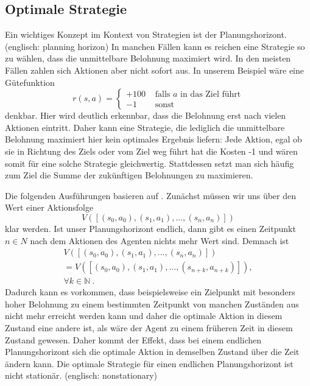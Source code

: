 \documentclass[a4paper]{IEEEtran}
\begin{document}
\subsection{Optimale Strategie}
Ein wichtiges Konzept im Kontext von Strategien ist der Planungshorizont. (englisch: planning horizon) In manchen Fällen kann es reichen eine Strategie so zu wählen, dass die unmittelbare Belohnung maximiert wird. In den meisten Fällen zahlen sich Aktionen aber nicht sofort aus. In unserem Beispiel wäre eine Gütefunktion
\begin{equation}
	r(s,a) = \left\{ \begin{array}{rl}
		+100 &\mbox{ falls $a$ in das Ziel führt} \\
		-1 &\mbox{ sonst}
       \end{array} \right.
\end{equation}
denkbar. Hier wird deutlich erkennbar, dass die Belohnung erst nach vielen Aktionen eintritt. Daher kann eine Strategie, die lediglich die unmittelbare Belohnung maximiert hier kein optimales Ergebnis liefern: Jede Aktion, egal ob sie in Richtung des Ziels oder vom Ziel weg führt hat die Kosten -1 und wären somit für eine solche Strategie gleichwertig.
Stattdessen setzt man sich häufig zum Ziel die Summe der zukünftigen Belohnungen zu maximieren.

Die folgenden Ausführungen basieren auf \cite{russell1995artificial}. Zunächst müssen wir uns über den Wert einer Aktionsfolge 
\begin{equation}
	V([(s_0, a_0), (s_1, a_1), ..., (s_n, a_n)])
\end{equation}
klar werden. Ist unser Planungshorizont endlich, dann gibt es einen Zeitpunkt $n \in N$ nach dem Aktionen des Agenten nichts mehr Wert sind. Demnach ist 
\begin{equation}
	\begin{split}
		V([ (s_0, a_0), (s_1, a_1), ..., (s_n, a_n)]) \\
		= V([ (s_0, a_0), (s_1, a_1), ..., (s_{n+k}, a_{n+k})]),\\
		\forall k \in \mathbb{N} \ .
	\end{split}
\end{equation}
Dadurch kann es vorkommen, dass beispielsweise ein Zielpunkt mit besonders hoher Belohnung zu einem bestimmten Zeitpunkt von manchen Zuständen aus nicht mehr erreicht werden kann und daher die optimale Aktion in diesem Zustand eine andere ist, als wäre der Agent zu einem früheren Zeit in diesem Zustand gewesen. Daher kommt der Effekt, dass bei einem endlichen Planungshorizont sich die optimale Aktion in demselben Zustand über die Zeit ändern kann. Die optimale Strategie für einen endlichen Planungshorizont ist nicht stationär. (englisch: nonstationary)
\end{document}

